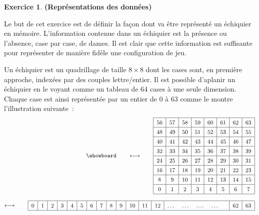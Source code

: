 \documentclass[11pt]{article}
\theoremstyle{definition}
\newtheorem{Exercice}{Exercice}
\begin{document}
\begin{Exercice} {\bf (Représentations des données)}\smallskip
\label{ex:representation}

Le but de cet exercice est de définir la façon dont va être représenté
un échiquier en mémoire. L'information contenue dans un échiquier est
la présence ou l'absence, case par case, de dames. Il est clair que
cette information est suffisante pour représenter de manière fidèle
une configuration de jeu.
\smallskip

Un échiquier est un quadrillage de taille $8 \times 8$ dont les cases
sont, en première approche, indexées par des couples lettre/entier. Il
est possible d'\og aplanir \fg{} un échiquier en le voyant comme un
tableau de $64$ cases à une seule dimension. Chaque case est ainsi
représentée par un entier de $0$ à $63$ comme le montre l'illustration
suivante~:
\begin{equation*}\begin{split}
    \begin{split}\showboard\end{split}
    \qquad \longleftrightarrow \qquad
    \renewcommand{\arraystretch}{1.35}
    \begin{split}
    \begin{tabular}{|c|c|c|c|c|c|c|c|} \hline
        56 & 57 & 58 & 59 & 60 & 61 & 62 & 63 \\ \hline
        48 & 49 & 50 & 51 & 52 & 53 & 54 & 55 \\ \hline
        40 & 41 & 42 & 43 & 44 & 45 & 46 & 47 \\ \hline
        32 & 33 & 34 & 35 & 36 & 37 & 38 & 39 \\ \hline
        24 & 25 & 26 & 27 & 28 & 29 & 30 & 31 \\ \hline
        16 & 17 & 18 & 19 & 20 & 21 & 22 & 23 \\ \hline
        8 & 9 & 10 & 11 & 12 & 13 & 14 & 15 \\ \hline
        0 & 1 & 2 & 3 & 4 & 5 & 6 & 7 \\ \hline
    \end{tabular}
    \end{split} \\[.75em]
    \longleftrightarrow \qquad
    \begin{tabular}{|c|c|c|c|c|c|c|c|c|c|c|c|c|ccccc|c|c|} \hline
        0 & 1 & 2 & 3 & 4 & 5 & 6 & 7 & 8 & 9 & 10 & 11 & 12 &
        \dots & \dots & \dots & \dots & & 62 & 63 \\ \hline
    \end{tabular}
\end{split}\end{equation*}
\smallskip


\end{Exercice}
\end{document}

